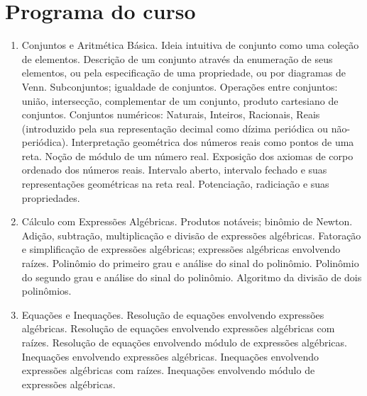 \chapter{Programa do curso}

\begin{enumerate}
\item Conjuntos e Aritmética Básica. Ideia intuitiva de conjunto como uma coleção de elementos. Descrição de um conjunto através da enumeração de seus elementos, ou pela especificação de uma propriedade, ou por diagramas de Venn. Subconjuntos; igualdade de conjuntos. Operações entre conjuntos: união, intersecção, complementar de um conjunto, produto cartesiano de conjuntos. Conjuntos numéricos: Naturais, Inteiros, Racionais, Reais (introduzido pela sua representação decimal como dízima periódica ou não-periódica). Interpretação geométrica dos números reais como pontos de uma reta. Noção de módulo de um número real. Exposição dos axiomas de corpo ordenado dos números reais. Intervalo aberto, intervalo fechado e suas representações geométricas na reta real. Potenciação, radiciação e suas propriedades.

 \item Cálculo com Expressões Algébricas. Produtos notáveis; binômio de Newton. Adição, subtração, multiplicação e divisão de expressões algébricas. Fatoração e simplificação de expressões algébricas; expressões algébricas envolvendo raízes. Polinômio do primeiro grau e análise do sinal do polinômio. Polinômio do segundo grau e análise do sinal do polinômio. Algoritmo da divisão de dois polinômios.

 \item Equações e Inequações. Resolução de equações envolvendo expressões algébricas. Resolução de equações envolvendo expressões algébricas com raízes. Resolução de equações envolvendo módulo de expressões algébricas. Inequações envolvendo expressões algébricas. Inequações envolvendo expressões algébricas com raízes. Inequações envolvendo módulo de expressões algébricas.


\end{enumerate}

